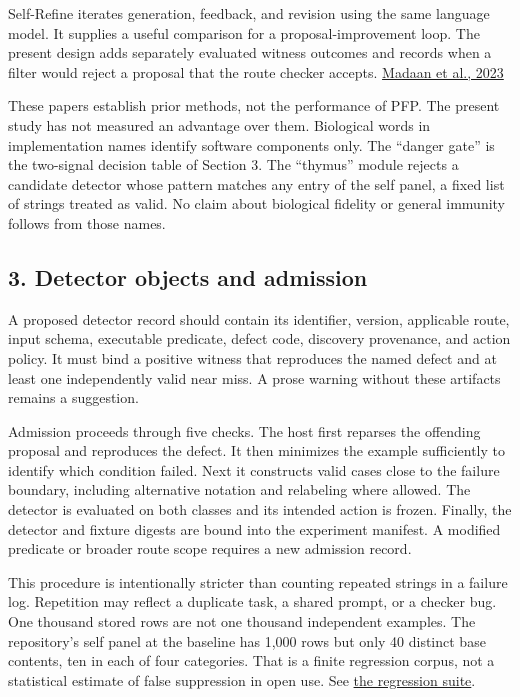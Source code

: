\documentclass[
  11pt,
]{article}
\begin{document}
Self-Refine iterates generation, feedback, and revision using the same
language model. It supplies a useful comparison for a
proposal-improvement loop. The present design adds separately evaluated
witness outcomes and records when a filter would reject a proposal that
the route checker accepts.
\href{https://arxiv.org/abs/2303.17651v2}{Madaan et al., 2023}

These papers establish prior methods, not the performance of PFP. The
present study has not measured an advantage over them. Biological words
in implementation names identify software components only. The ``danger
gate'' is the two-signal decision table of Section 3. The ``thymus''
module rejects a candidate detector whose pattern matches any entry of
the self panel, a fixed list of strings treated as valid. No claim about
biological fidelity or general immunity follows from those names.

\subsection{3. Detector objects and
admission}\label{detector-objects-and-admission}

A proposed detector record should contain its identifier, version,
applicable route, input schema, executable predicate, defect code,
discovery provenance, and action policy. It must bind a positive witness
that reproduces the named defect and at least one independently valid
near miss. A prose warning without these artifacts remains a suggestion.

Admission proceeds through five checks. The host first reparses the
offending proposal and reproduces the defect. It then minimizes the
example sufficiently to identify which condition failed. Next it
constructs valid cases close to the failure boundary, including
alternative notation and relabeling where allowed. The detector is
evaluated on both classes and its intended action is frozen. Finally,
the detector and fixture digests are bound into the experiment manifest.
A modified predicate or broader route scope requires a new admission
record.

This procedure is intentionally stricter than counting repeated strings
in a failure log. Repetition may reflect a duplicate task, a shared
prompt, or a checker bug. One thousand stored rows are not one thousand
independent examples. The repository's self panel at the baseline has
1,000 rows but only 40 distinct base contents, ten in each of four
categories. That is a finite regression corpus, not a statistical
estimate of false suppression in open use. See
\href{https://github.com/dbccpage/the_symbol_game/blob/52cb5457f6c485ba548cfd292f6012a941ed22cf/symbol_game/tests/test_immune_defect_regressions.py}{the
regression suite}.
\end{document}
